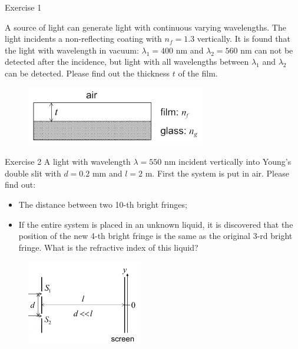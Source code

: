 \documentclass{beamer}
\begin{document}
\begin{frame}{Exercise 1}

    A source of light can generate light with continuous varying wavelengths. The light incidents a non-reflecting coating with $n_f =1.3$ vertically. It is found that the light with wavelength in vacuum: $\lambda_1= 400$ nm and $\lambda_2= 560$ nm can not be detected after the incidence, but light with all wavelengths between $\lambda_1$ and $\lambda_2$ can be detected. Please find out the thickness $t$  of the film.

    \begin{figure}[htbp]
        \centering
        \includegraphics[width=0.7\textwidth]{Images/ex1.jpg}
    \end{figure}

\end{frame}

\begin{frame}{Exercise 2}
    A light with wavelength $\lambda=550$ nm incident vertically into Young's double slit with $d=0.2$ mm and $l=2$ m. First the system is put in air. Please find out:
    \begin{itemize}
        \item The distance between two 10-th bright fringes;
        \item If the entire system is placed in an unknown liquid, it is discovered that the position of the new 4-th bright fringe is the same as the original 3-rd bright fringe. What is the refractive index of this liquid?
    \end{itemize}

    \begin{figure}[htbp]
        \centering
        \includegraphics[width=0.45\textwidth]{Images/ex2.jpg}
    \end{figure}
\end{frame}
\end{document}
